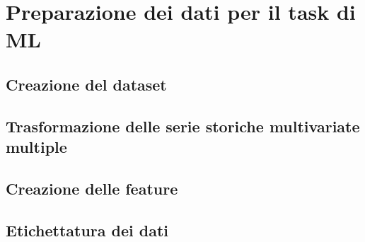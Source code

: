 \label{chap:machine_learning}
\section{Preparazione dei dati per il task di ML}
\subsection{Creazione del dataset}
\subsection{Trasformazione delle serie storiche multivariate multiple}






\subsection{Creazione delle feature}







\subsection{Etichettatura dei dati}


